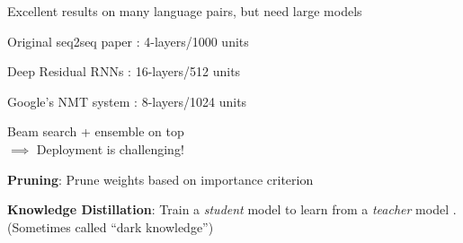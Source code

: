 \documentclass{beamer}
\let\tempone\itemize
\let\temptwo\enditemize
\renewenvironment{itemize}{\tempone\addtolength{\itemsep}{0.5\baselineskip}}{\temptwo}
\newcommand{\air}{\vspace{0.25cm}}
\newcommand{\Cite}[1]{{\footnotesize \citep{#1}}}
\begin{document}
\begin{frame}
\centerline{} \air \air
Excellent results on many language pairs, but need large models \air
\begin{itemize}
\item Original seq2seq paper \Cite{Sutskever2014}: 4-layers/1000 units
\item Deep Residual RNNs \Cite{Zhou2016} : 16-layers/512 units 
\item Google's NMT system \Cite{Wu2016}: 8-layers/1024 units 
\end{itemize}
\air 
\air 

Beam search + ensemble on top
\\ 
\air
$\implies$ Deployment is challenging! 
\end{frame}


\begin{frame}
  \centerline{}
\air
\begin{itemize}
\item \textbf{Pruning}: Prune weights based on importance criterion 
\Cite{LeCun1990,Han2016,See2016}
\item \textbf{Knowledge Distillation}: Train a \textit{student} model to learn 
from a \textit{teacher} model \Cite{Bucila2006,Ba2014,Hinton2015,Kuncoro2016}. 
(Sometimes called ``dark knowledge'')
\end{itemize}
\end{frame}
\end{document}
